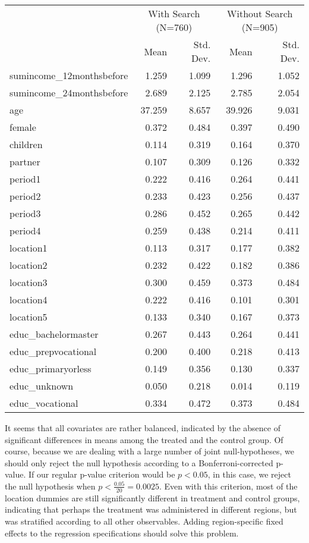 \documentclass[
]{article}
\begin{document}
\begin{table}
\centering
\fontsize{10}{12}\selectfont
\begin{tabular}[t]{lrrrr}
\toprule
\multicolumn{1}{c}{ } & \multicolumn{2}{c}{With Search (N=760)} & \multicolumn{2}{c}{Without Search (N=905)} \\
\cmidrule(l{3pt}r{3pt}){2-3} \cmidrule(l{3pt}r{3pt}){4-5}
  & Mean & Std. Dev. & Mean  & Std. Dev. \\
\midrule
sumincome_12monthsbefore & 1.259 & 1.099 & 1.296 & 1.052\\
sumincome_24monthsbefore & 2.689 & 2.125 & 2.785 & 2.054\\
age & 37.259 & 8.657 & 39.926 & 9.031\\
female & 0.372 & 0.484 & 0.397 & 0.490\\
children & 0.114 & 0.319 & 0.164 & 0.370\\
partner & 0.107 & 0.309 & 0.126 & 0.332\\
period1 & 0.222 & 0.416 & 0.264 & 0.441\\
period2 & 0.233 & 0.423 & 0.256 & 0.437\\
period3 & 0.286 & 0.452 & 0.265 & 0.442\\
period4 & 0.259 & 0.438 & 0.214 & 0.411\\
location1 & 0.113 & 0.317 & 0.177 & 0.382\\
location2 & 0.232 & 0.422 & 0.182 & 0.386\\
location3 & 0.300 & 0.459 & 0.373 & 0.484\\
location4 & 0.222 & 0.416 & 0.101 & 0.301\\
location5 & 0.133 & 0.340 & 0.167 & 0.373\\
educ_bachelormaster & 0.267 & 0.443 & 0.264 & 0.441\\
educ_prepvocational & 0.200 & 0.400 & 0.218 & 0.413\\
educ_primaryorless & 0.149 & 0.356 & 0.130 & 0.337\\
educ_unknown & 0.050 & 0.218 & 0.014 & 0.119\\
educ_vocational & 0.334 & 0.472 & 0.373 & 0.484\\
\bottomrule
\end{tabular}
\end{table}

It seems that all covariates are rather balanced, indicated by the
absence of significant differences in means among the treated and the
control group. Of course, because we are dealing with a large number of
joint null-hypotheses, we should only reject the null hypothesis
according to a Bonferroni-corrected p-value. If our regular p-value
criterion would be \(p < 0.05\), in this case, we reject the null
hypothesis when \(p < \frac{0.05}{20} = 0.0025\). Even with this
criterion, most of the location dummies are still significantly
different in treatment and control groups, indicating that perhaps the
treatment was administered in different regions, but was stratified
according to all other observables. Adding region-specific fixed effects
to the regression specifications should solve this problem.
\end{document}
